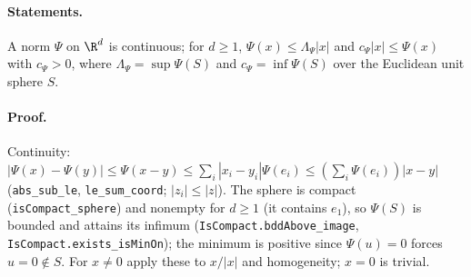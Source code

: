\paragraph{Statements.} A norm $\Psi$ on $\R^d$ is continuous; for $d\ge1$,
$\Psi(x)\le\Lambda_\Psi|x|$ and $c_\Psi|x|\le\Psi(x)$ with $c_\Psi>0$, where $\Lambda_\Psi=\sup\Psi(S)$
and $c_\Psi=\inf\Psi(S)$ over the Euclidean unit sphere $S$.
\paragraph{Proof.} Continuity: $|\Psi(x)-\Psi(y)|\le\Psi(x-y)\le\sum_i|x_i-y_i|\Psi(e_i)
\le(\sum_i\Psi(e_i))|x-y|$ (\texttt{abs\_sub\_le}, \texttt{le\_sum\_coord}; $|z_i|\le|z|$). The sphere is
compact (\texttt{isCompact\_sphere}) and nonempty for $d\ge1$ (it contains $e_1$), so $\Psi(S)$ is
bounded and attains its infimum (\texttt{IsCompact.bddAbove\_image},
\texttt{IsCompact.exists\_isMinOn}); the minimum is positive since $\Psi(u)=0$ forces $u=0\notin S$.
For $x\ne0$ apply these to $x/|x|$ and homogeneity; $x=0$ is trivial.
